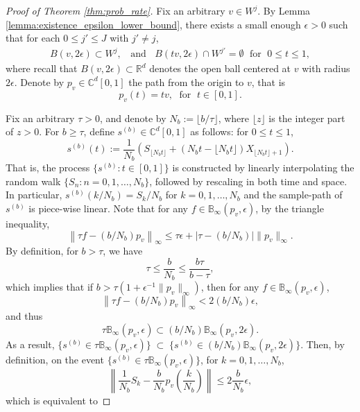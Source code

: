 \documentclass[aap,preprint]{imsart}
\theoremstyle{plain}
\theoremstyle{definition}
\begin{document}
\begin{appendix}
\begin{proof}[Proof of Theorem \ref{thm:prob_rate}]
Fix an arbitrary $v \in W^j$. By Lemma \ref{lemma:existence_epsilon_lower_bound}, there exists a small enough $\epsilon > 0$ such that
 for each $0 \leq j' \leq J$ with $j' \neq j$,
\begin{align}\label{set_property}
         B(v, 2\epsilon) \subset W^j, \;\;\text{ and } \;\;
        B(tv, 2\epsilon)\cap W^{j'} = \emptyset\; \text{ for } \;0 \leq t \leq 1,
\end{align}
where recall that $B(v, 2\epsilon) \subset \mathbb{R}^d$ denotes the open ball centered at $v$ with radius $2\epsilon$. Denote by $p_{v} \in \mathbb{C}^d[0,1]$ the path from the origin to $v$, that is
$$
p_v(t) = t v,\; \text{ for } \;t \in [0,1].
$$


Fix an arbitrary $\tau > 0$, and denote by $N_b  :=  \lfloor b /\tau \rfloor$, where $\lfloor z \rfloor$ is the integer part of $z > 0$. For $b \geq \tau$, define $s^{(b)} \in \mathbb{C}^d[0,1]$ as follows: for $0 \leq t \leq 1$,
$$
s^{(b)}(t)  :=  \frac{1}{N_b} \left( S_{\lfloor N_b t  \rfloor} + \left(N_b t - \lfloor N_b t \rfloor \right)  X_{\lfloor N_b t \rfloor + 1} \right).
$$
That is, the process $\{s^{(b)}:t \in [0,1]\}$ is constructed by linearly interpolating the random walk $\{S_n : n = 0,1,\ldots, N_b\}$, followed by rescaling in both time and space. In particular,
$s^{(b)}(k/N_b) = S_{k}/N_b$ for $k = 0,1,\ldots,N_b$ and the sample-path of $s^{(b)}$ is piece-wise linear.  Note that for any $f \in \mathbb{B}_{\infty}(p_v, \epsilon)$, by the triangle inequality,
$$
\left\| \tau f -  (b/N_b) p_v\right\|_{\infty} \leq \tau \epsilon + 
\left|\tau - (b/N_b)\right| \|p_v\|_{\infty}.
$$
By definition, for $b > \tau$, we have
$$\tau \leq \frac{b}{N_b} \leq \frac{b\tau}{b - \tau},
$$
which implies that if  $b > \tau ( 1+\epsilon^{-1}\|p_v\|_{\infty})$, then  for any $f \in \mathbb{B}_{\infty}(p_v, \epsilon)$,
$$
\left\| \tau f -  (b/N_b) p_v\right\|_{\infty}  < 2(b/N_b)\epsilon, 
$$
and thus
$$
\tau \mathbb{B}_{\infty}(p_v, \epsilon) \subset (b/N_b) \mathbb{B}_{\infty}(p_v, 2\epsilon).
$$
As a result,  $\{s^{(b)} \in \tau \mathbb{B}_{\infty}(p_v, \epsilon)\}\; \subset \;
\{s^{(b)} \in  (b/N_b) \mathbb{B}_{\infty}(p_v, 2\epsilon)\}$.
Then, by definition,  on the event $\{s^{(b)} \in \tau \mathbb{B}_{\infty}(p_v, \epsilon)\}$,  for $k = 0,1,\ldots, N_b$,
$$
\left\|\frac{1}{N_b} S_{k} - \frac{b}{N_b} p_v\left(\frac{k}{N_b}\right) \right\| \leq 2\frac{b}{N_b}  \epsilon,
$$
which is equivalent to 

\end{proof}
\end{appendix}
\end{document}
